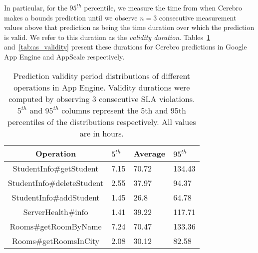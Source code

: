 In particular, for the $95^{th}$ percentile, we measure the time from when
Cerebro makes a bounds prediction until we observe $n=3$ consecutive
measurement values above that prediction as being the time duration over which
the prediction is valid. We refer to this duration as the \textit{validity duration}.  
Tables~\ref{tab:gae_validity} and~\ref{tab:as_validity} present these durations
for Cerebro predictions in Google App Engine and AppScale
respectively.

\begin{table}
\caption{Prediction validity period distributions of different operations in
App Engine. Validity durations were computed by observing $3$ consecutive SLA
violations. $5^{th}$ and $95^{th}$ columns represent the 5th and 95th 
percentiles of the
distributions respectively. All values are in hours.
\label{tab:gae_validity}
}
\begin{center}
\begin{tabular}{|c|p{1cm}|p{1cm}|p{1cm}|}
\hline
Operation & $5^{th}$ & Average & $95^{th}$ \\ \hline
StudentInfo\#getStudent & 7.15 & 70.72 & 134.43 \\ \hline
StudentInfo\#deleteStudent & 2.55 & 37.97 & 94.37 \\ \hline
StudentInfo\#addStudent & 1.45 & 26.8 & 64.78 \\ \hline
ServerHealth\#info & 1.41 & 39.22 & 117.71 \\ \hline
Rooms\#getRoomByName & 7.24 & 70.47 & 133.36 \\ \hline
Rooms\#getRoomsInCity & 2.08 & 30.12 & 82.58 \\ \hline
\end{tabular}
\end{center}
\vspace{-0.1in}
\end{table}

